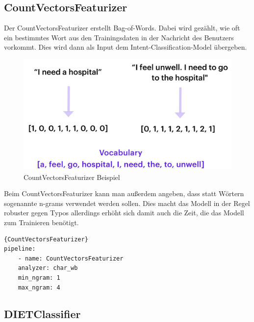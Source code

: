 \subsection{CountVectorsFeaturizer}

Der CountVectorsFeaturizer erstellt Bag-of-Words.
Dabei wird gezählt, wie oft ein bestimmtes Wort aus den Trainingsdaten in der Nachricht des Benutzers vorkommt.
Dies wird dann als Input dem Intent-Classification-Model übergeben.\cite{countVectorsFeaturizer, pipelineConfigurationVideo, pipelineComponentsYoutube, rasaMasterclassCountVectorsFeaturizer}

\begin{figure}[hbt!]
    \centering
    \includegraphics[scale=0.25]{pics/countvectorsfeaturizer}
    \caption{CountVectorsFeaturizer Beispiel~\cite{pipelineConfigurationVideo}}
    \label{fig:CountVectorsFeaturizer}
\end{figure}

Beim CountVectorsFeaturizer kann man außerdem angeben, dass statt Wörtern sogenannte n-grams verwendet werden sollen.
Dies macht das Modell in der Regel robuster gegen Typos allerdings erhöht sich damit auch die Zeit, die das Modell zum Trainieren benötigt.\cite{countVectorsFeaturizer, pipelineConfigurationVideo, pipelineComponentsYoutube, rasaMasterclassCountVectorsFeaturizer}

\begin{lstlisting}[label={lst:count-vectors-featurizer},caption={CountVectorsFeaturizer}]{CountVectorsFeaturizer}
pipeline:
    - name: CountVectorsFeaturizer
    analyzer: char_wb
    min_ngram: 1
    max_ngram: 4
\end{lstlisting}

\subsection{DIETClassifier}\label{subsec:dietclassifier}

